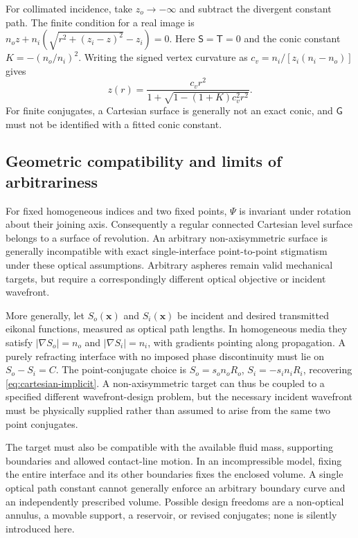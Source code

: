 For collimated incidence, take $z_o\to-\infty$ and subtract the divergent constant
path. The finite condition for a real image is
$n_oz+n_i(\sqrt{r^2+(z_i-z)^2}-z_i)=0$. Here $\mathsf S=\mathsf T=0$ and the
conic constant $K=-(n_o/n_i)^2$. Writing the signed vertex curvature as
$c_v=n_i/[z_i(n_i-n_o)]$ gives
\begin{equation}
 z(r)=\frac{c_v r^2}{1+\sqrt{1-(1+K)c_v^2r^2}}.
 \label{eq:collimated-conic}
\end{equation}
For finite conjugates, a Cartesian surface is generally not an exact conic, and
$\mathsf G$ must not be identified with a fitted conic constant.

\subsection{Geometric compatibility and limits of arbitrariness}
For fixed homogeneous indices and two fixed points, $\Psi$ is invariant under
rotation about their joining axis. Consequently a regular connected Cartesian
level surface belongs to a surface of revolution. An arbitrary non-axisymmetric
surface is generally incompatible with exact single-interface point-to-point
stigmatism under these optical assumptions. Arbitrary aspheres remain valid
mechanical targets, but require a correspondingly different optical objective
or incident wavefront.

More generally, let $S_o(\bm x)$ and $S_i(\bm x)$ be incident and desired
transmitted eikonal functions, measured as optical path lengths. In homogeneous
media they satisfy $|\nabla S_o|=n_o$ and $|\nabla S_i|=n_i$, with gradients
pointing along propagation. A purely refracting interface with no imposed
phase discontinuity must lie on $S_o-S_i=C$. The point-conjugate choice is
$S_o=s_on_oR_o$, $S_i=-s_in_iR_i$, recovering
\cref{eq:cartesian-implicit}. A non-axisymmetric target can thus be coupled to
a specified different wavefront-design problem, but the necessary incident
wavefront must be physically supplied rather than assumed to arise from the
same two point conjugates.

The target must also be compatible with the available fluid mass, supporting
boundaries and allowed contact-line motion. In an incompressible model, fixing
the entire interface and its other boundaries fixes the enclosed volume. A
single optical path constant cannot generally enforce an arbitrary boundary
curve and an independently prescribed volume. Possible design freedoms are a
non-optical annulus, a movable support, a reservoir, or revised conjugates; none
is silently introduced here.

